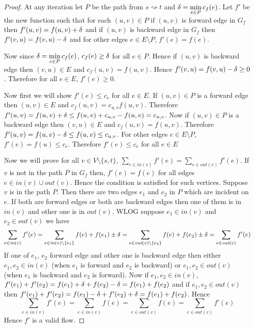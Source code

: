 \begin{proof}
	At any iteration  let $P$ be the path from $s\rightsquigarrow t$ and $\delta=\min\limits_{e\in P}c_f(e)$. Let $f'$ be the new function such that for each $(u,v)\in P$ if $(u,v)$ is forward edge in $G_f$ then $f'(u,v)=f(u,v)+\delta$ and if $(u,v)$ is backward edge in $G_f$ then $f'(v,u)=f(v,u)-\delta$ and for other edges $e\in E\setminus P$, $f'(e)=f(e)$. 
	
		Now since $\delta=\min\limits_{e\in P}c_f(e)$, $c_f(e)\geq \delta$ for all $e\in P$. Hence if $(u,v)$ is backward edge then $(v,u)\in E$ and $c_f(u,v)=f(u,v)$. Hence $f'(v,u)=f(v,u)-\delta\geq 0$. Therefore for all $e\in E$, $f'(e)\geq 0$. 
	
	Now first we will show $f'(e)\leq c_e$ for all $e\in E$. If $(u,v)\in P$ is a forward edge then $(u,v)\in E$ and $c_f(u,v)=c_{u,v}f(u,v)$. Therefore $f'(u,v)=f(u,v)+\delta\leq f(u,v)+c_{u,v}-f(u,v)=c_{u,v}$. Now if $(u,v)\in P$ is a backward edge then $(v,u)\in E$ and $c_f(u,v)=f(u,v)$. Therefore $f'(u,v)=f(u,v)-\delta\leq f(u,v)\leq c_{u,v}$. For other edges $e\in E\setminus P$, $f'(e)=f(u)\leq c_e$. Therefore $f'(e)\leq c_e$ for all $e\in E$
	
	Now we will prove for all $v\in V\setminus\{s,t\}$, $\sum\limits_{e\in \textit{in}(v)}f'(e)=\sum\limits_{e\in\textit{out}(v)}f'(e)$. If $v$ is not in the path $P$ in $G_f$ then, $f'(e)=f(e)$ for all edges $e\in \textit{in}(v)\cup \textit{out}(v)$. Hence the condition is satisfied for such vertices. Suppose $v$ is in the path $P$. Then there are two edges $e_1$ and $e_2$ in $P$ which are incident on $e$. If both are forward edges or both are backward edges then one of them is in $\textit{in}(v)$ and other one is in $\textit{out}(v)$. WLOG suppose $e_1\in \textit{in}(v)$ and $e_2\in\textit{out}(v)$ we have $$\sum\limits_{e\in \textit{in}(v)}f'(e)=\sum\limits_{e\in \textit{in}(v)\setminus\{e_1\}}f(e)+f(e_1)\pm \delta=\sum\limits_{e\in\textit{out}(v)\setminus \{e_2\}}f(e)+f(e_2)\pm \delta=\sum\limits_{e\in\textit{out}(v)}f'(e)$$If one of $e_1$, $e_2$ forward edge and other one is backward edge then either $e_1,e_2\in \textit{in}(v)$ (when $e_1$ is forward and $e_2$ is backward) or $e_1,e_2\in \textit{out}(v)$ (when $e_1$ is backward and $e_2$ is forward). Now if $e_1,e_2\in \textit{in}(v)$, $f'(e_1)+f'(e_2)=f(e_1)+\delta+f(e_2)-\delta=f(e_1)+f(e_2)$ and if $e_1,e_2\in\textit{out}(v)$ then $f'(e_1)+f'(e_2)=f(e_1)-\delta+f'(e_2)+\delta=f(e_1)+f(e_2)$. Hence $$\sum\limits_{e\in \textit{in}(v)}f'(e)=\sum\limits_{e\in \textit{in}(v)}f(e)=\sum\limits_{e\in\textit{out}(v)}f(e)=\sum\limits_{e\in\textit{out}(v)}f'(e)$$ Hence $f'$ is a valid flow. 
\end{proof}

